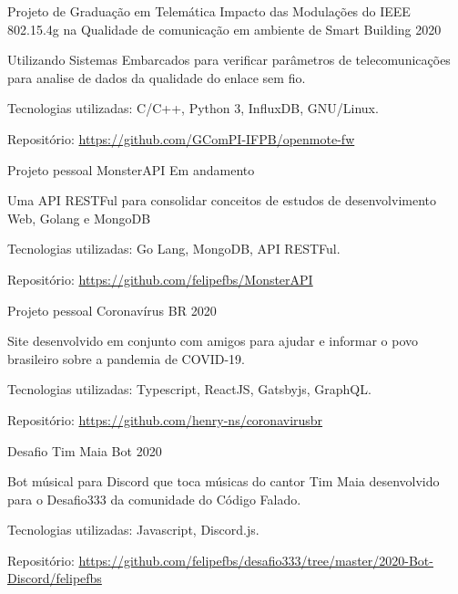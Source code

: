 
\begin{cventries}
  \cventry
  {Projeto de Graduação em Telemática} %
  {Impacto das Modulações do IEEE 802.15.4g na Qualidade de comunicação em ambiente de Smart Building} %
  {} %
  {2020} %
  {
    \begin{cvitems} %
      \item {Utilizando Sistemas Embarcados para verificar parâmetros de telecomunicações para analise de dados da qualidade do enlace sem fio.}
      \item {Tecnologias utilizadas: C/C++, Python 3, InfluxDB, GNU/Linux.}
      \item {Repositório: \url{https://github.com/GComPI-IFPB/openmote-fw}}
    \end{cvitems}
  }

  \cventry
  {Projeto pessoal} %
  {MonsterAPI} %
  {} %
  {Em andamento} %
  {
    \begin{cvitems} %
      \item {Uma API RESTFul para consolidar conceitos de estudos de desenvolvimento Web, Golang e MongoDB}
      \item {Tecnologias utilizadas: Go Lang, MongoDB, API RESTFul.}
      \item {Repositório: \url{https://github.com/felipefbs/MonsterAPI}}
    \end{cvitems}
  }

  \cventry
  {Projeto pessoal} %
  {Coronavírus BR} %
  {} %
  {2020} %
  {
    \begin{cvitems} %
      \item {Site desenvolvido em conjunto com amigos para ajudar e informar o povo brasileiro sobre a pandemia de COVID-19.}
      \item {Tecnologias utilizadas: Typescript, ReactJS, Gatsbyjs, GraphQL.}
      \item {Repositório: \url{https://github.com/henry-ns/coronavirusbr}}
    \end{cvitems}
  }

  \cventry
  {Desafio} %
  {Tim Maia Bot} %
  {} %
  {2020} %
  {
    \begin{cvitems} %
      \item {Bot músical para Discord que toca músicas do cantor Tim Maia desenvolvido para o Desafio333 da comunidade do Código Falado.}
      \item {Tecnologias utilizadas: Javascript, Discord.js.}
      \item {Repositório: \url{https://github.com/felipefbs/desafio333/tree/master/2020-Bot-Discord/felipefbs}}
    \end{cvitems}
  }


\end{cventries}
